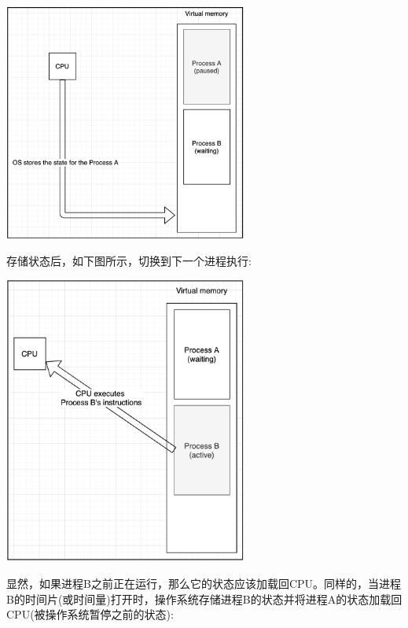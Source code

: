 \begin{center}
	\includegraphics[width=0.6\textwidth]{content/Section-2/Chapter-8/4}
\end{center}

存储状态后，如下图所示，切换到下一个进程执行: \par

\begin{center}
	\includegraphics[width=0.6\textwidth]{content/Section-2/Chapter-8/5}
\end{center}

显然，如果进程B之前正在运行，那么它的状态应该加载回CPU。同样的，当进程B的时间片(或时间量)打开时，操作系统存储进程B的状态并将进程A的状态加载回CPU(被操作系统暂停之前的状态): \par

